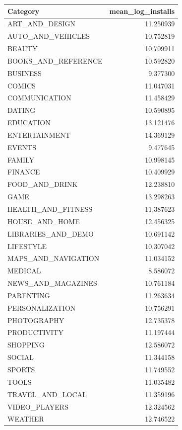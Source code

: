 \documentclass[
]{article}
\newcounter{none} %
\begin{document}
{\def\LTcaptype{none} %
\begin{longtable}[]{@{}lr@{}}
\toprule\noalign{}
Category & mean\_log\_installs \\
\midrule\noalign{}
\endhead
\bottomrule\noalign{}
\endlastfoot
ART\_AND\_DESIGN & 11.250939 \\
AUTO\_AND\_VEHICLES & 10.752819 \\
BEAUTY & 10.709911 \\
BOOKS\_AND\_REFERENCE & 10.592820 \\
BUSINESS & 9.377300 \\
COMICS & 11.047031 \\
COMMUNICATION & 11.458429 \\
DATING & 10.590895 \\
EDUCATION & 13.121476 \\
ENTERTAINMENT & 14.369129 \\
EVENTS & 9.477645 \\
FAMILY & 10.998145 \\
FINANCE & 10.409929 \\
FOOD\_AND\_DRINK & 12.238810 \\
GAME & 13.298263 \\
HEALTH\_AND\_FITNESS & 11.387623 \\
HOUSE\_AND\_HOME & 12.456325 \\
LIBRARIES\_AND\_DEMO & 10.691142 \\
LIFESTYLE & 10.307042 \\
MAPS\_AND\_NAVIGATION & 11.034152 \\
MEDICAL & 8.586072 \\
NEWS\_AND\_MAGAZINES & 10.761184 \\
PARENTING & 11.263634 \\
PERSONALIZATION & 10.756291 \\
PHOTOGRAPHY & 12.735378 \\
PRODUCTIVITY & 11.197444 \\
SHOPPING & 12.586072 \\
SOCIAL & 11.344158 \\
SPORTS & 11.749552 \\
TOOLS & 11.035482 \\
TRAVEL\_AND\_LOCAL & 11.359196 \\
VIDEO\_PLAYERS & 12.324562 \\
WEATHER & 12.746522 \\
\end{longtable}
}
\end{document}
